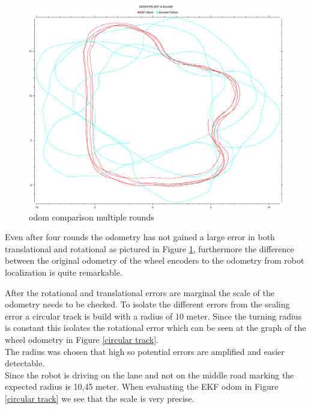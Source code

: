 \begin{figure}[H]
	\includegraphics[width=\textwidth]{Pictures/odom comp multiple rounds}
	\caption{odom comparison multiple rounds}
	\label{Odom comparison multiple rounds}

\end{figure}

Even after four rounds the odometry has not gained a large error in both translational and rotational as pictured in Figure \ref{Odom comparison multiple rounds}, furthermore the difference between the original odometry of the wheel encoders to the odometry from robot localization is quite remarkable.

After the rotational and translational errors are marginal the scale of the odometry needs to be checked.
To isolate the different errors from the scaling error a circular track is build with a radius of 10 meter. Since the turning radius is constant this isolates the rotational error which can be seen at the graph of the wheel odometry in Figure \ref{circular track}.\\
The radius was chosen that high so potential errors are amplified and easier detectable.\\

Since the robot is driving on the lane and not on the middle road marking the expected radius is 10,45 meter. When evaluating the EKF odom in Figure \ref{circular track} we see that the scale is very precise.
 
